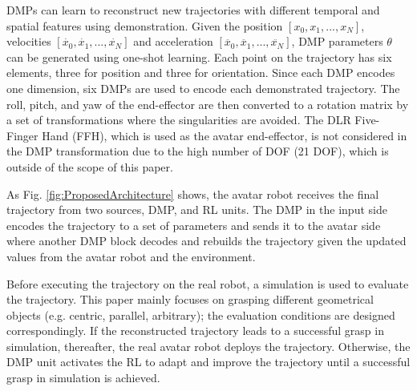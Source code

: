\documentclass[letterpaper, 10 pt, conference]{ieeeconf}  %
\begin{document}
DMPs can learn to reconstruct new trajectories with different temporal and spatial features using demonstration. Given the position $[x_0, x_1, ..., x_N]$, velocities $[\dot{x_0}, \dot{x_1}, ..., \dot{x_N}]$ and acceleration $[\ddot{x_0}, \ddot{x_1}, ..., \ddot{x_N}]$, DMP parameters $\theta$ can be generated using one-shot learning. 
Each point on the trajectory has six elements, three for position and three for orientation. Since each DMP encodes one dimension, six DMPs are used to encode each demonstrated trajectory. 
The roll, pitch, and yaw of the end-effector are then converted to a rotation matrix by a set of transformations where the singularities are avoided.
The DLR Five-Finger Hand (FFH), which is used as the avatar end-effector, is not considered in the DMP transformation due to the high number of DOF (21 DOF), which is outside of the scope of this paper.

\noindent
As Fig. \ref{fig:ProposedArchitecture} shows, the avatar robot receives the final trajectory from two sources, DMP, and RL units. The DMP in the input side encodes the trajectory to a set of parameters and sends it to the avatar side where another DMP block decodes and rebuilds the trajectory given the updated values from the avatar robot and the environment.

\noindent
Before executing the trajectory on the real robot, a simulation is used to evaluate the trajectory. This paper mainly focuses on grasping different geometrical objects (e.g. centric, parallel, arbitrary); the evaluation conditions are designed correspondingly. If the reconstructed trajectory leads to a successful grasp in simulation, thereafter, the real avatar robot deploys the trajectory. Otherwise, the DMP unit activates the RL to adapt and improve the trajectory until a successful grasp in simulation is achieved.
\end{document}
